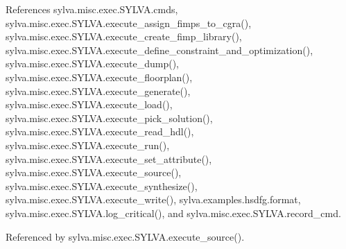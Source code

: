 References sylva.\+misc.\+exec.\+S\+Y\+L\+V\+A.\+cmds, sylva.\+misc.\+exec.\+S\+Y\+L\+V\+A.\+execute\+\_\+assign\+\_\+fimps\+\_\+to\+\_\+cgra(), sylva.\+misc.\+exec.\+S\+Y\+L\+V\+A.\+execute\+\_\+create\+\_\+fimp\+\_\+library(), sylva.\+misc.\+exec.\+S\+Y\+L\+V\+A.\+execute\+\_\+define\+\_\+constraint\+\_\+and\+\_\+optimization(), sylva.\+misc.\+exec.\+S\+Y\+L\+V\+A.\+execute\+\_\+dump(), sylva.\+misc.\+exec.\+S\+Y\+L\+V\+A.\+execute\+\_\+floorplan(), sylva.\+misc.\+exec.\+S\+Y\+L\+V\+A.\+execute\+\_\+generate(), sylva.\+misc.\+exec.\+S\+Y\+L\+V\+A.\+execute\+\_\+load(), sylva.\+misc.\+exec.\+S\+Y\+L\+V\+A.\+execute\+\_\+pick\+\_\+solution(), sylva.\+misc.\+exec.\+S\+Y\+L\+V\+A.\+execute\+\_\+read\+\_\+hdl(), sylva.\+misc.\+exec.\+S\+Y\+L\+V\+A.\+execute\+\_\+run(), sylva.\+misc.\+exec.\+S\+Y\+L\+V\+A.\+execute\+\_\+set\+\_\+attribute(), sylva.\+misc.\+exec.\+S\+Y\+L\+V\+A.\+execute\+\_\+source(), sylva.\+misc.\+exec.\+S\+Y\+L\+V\+A.\+execute\+\_\+synthesize(), sylva.\+misc.\+exec.\+S\+Y\+L\+V\+A.\+execute\+\_\+write(), sylva.\+examples.\+hsdfg.\+format, sylva.\+misc.\+exec.\+S\+Y\+L\+V\+A.\+log\+\_\+critical(), and sylva.\+misc.\+exec.\+S\+Y\+L\+V\+A.\+record\+\_\+cmd.



Referenced by sylva.\+misc.\+exec.\+S\+Y\+L\+V\+A.\+execute\+\_\+source().


